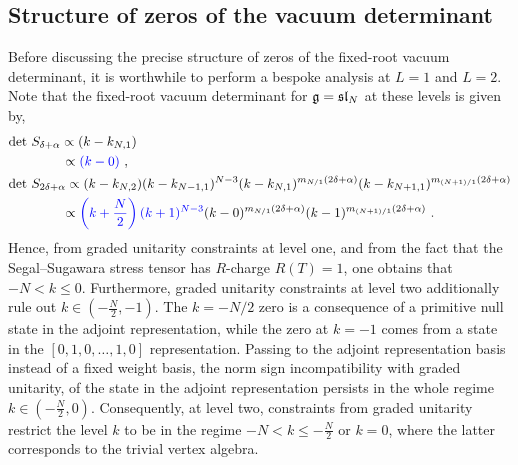 \subsection{Structure of zeros of the vacuum determinant}
Before discussing the precise structure of zeros of the fixed-root vacuum determinant, it is worthwhile to perform a bespoke analysis at $L = 1$ and $L = 2$. Note that the fixed-root vacuum determinant for $\mathfrak{g} = \mathfrak{sl}_N$ at these levels is given by,
\begin{equation} \label{eq:lowleveltypeAdet}
\begin{split}
    &\mathrm{det}~S_{\delta + \alpha} \propto (k-k_{N,1}) \\
    &\qquad \qquad \propto \textcolor{blue}{(k - 0)}~, \\
    &\mathrm{det}~S_{2\delta + \alpha} \propto (k - k_{N,2})(k-k_{N-1,1})^{N-3} (k - k_{N,1})^{m_{N/1}(2\delta + \alpha)} (k - k_{N+1,1})^{m_{(N+1)/1}(2\delta + \alpha)}\\ 
    &\qquad \qquad  \propto \textcolor{blue}{\left(k + \frac{N}{2} \right)(k + 1)^{N-3}} (k - 0)^{m_{N/1}(2\delta + \alpha)} (k - 1)^{m_{(N+1)/1}(2\delta + \alpha)}~.
\end{split}
\end{equation}
Hence, from graded unitarity constraints at level one, and from the fact that the Segal--Sugawara stress tensor has $R$-charge $R(T) = 1$, one obtains that $-N < k \leqslant 0$. Furthermore, graded unitarity constraints at level two additionally rule out $k \in \left(-\frac{N}{2},-1\right)$. The $k = -N/2$ zero is a consequence of a primitive null state in the adjoint representation, while the zero at $k = -1$ comes from a state in the $[0,1,0,\ldots,1,0]$ representation. Passing to the adjoint representation basis instead of a fixed weight basis, the norm sign incompatibility with graded unitarity, of the state in the adjoint representation persists in the whole regime $k \in \left(-\frac{N}{2}, 0\right)$. Consequently, at level two, constraints from graded unitarity restrict the level $k$ to be in the regime $-N < k \leqslant -\frac{N}{2}$ or $k = 0$, where the latter corresponds to the trivial vertex algebra.

